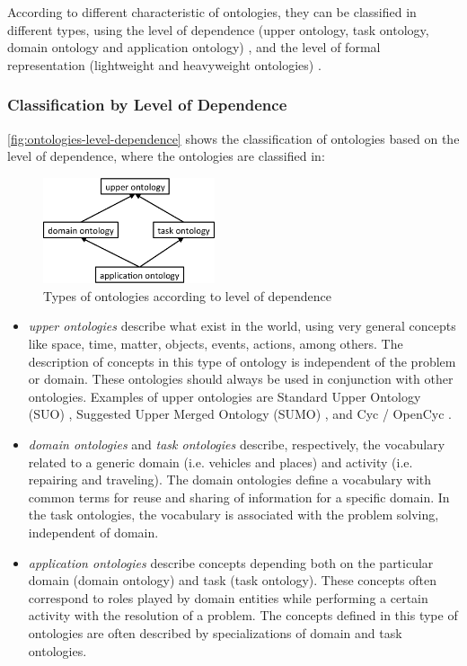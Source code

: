 According to different characteristic of ontologies, they can be classified in different types, using the level of dependence (upper ontology, task ontology, domain ontology and application ontology) \cite{Guarino1997a}, and the level of formal representation (lightweight and heavyweight ontologies) \cite{WongLiuBennamoun2012}. 

\subsubsection{Classification by Level of Dependence}
\label{subsubsec:classification-level-dependence}


\autoref{fig:ontologies-level-dependence} shows the classification of ontologies based on the level of dependence, where the ontologies are classified in:

\begin{figure}[htb]
 \caption{Types of ontologies according to level of dependence}
 \label{fig:ontologies-level-dependence}
 \centering
 \includegraphics[width=0.45\textwidth]{images/chap-general-background/ontologies-level-dependence.png}
\end{figure}

\begin{itemize}
\item \emph{upper ontologies} describe what exist in the world, using very general concepts like space, time, matter, objects, events, actions, among others.
The description of concepts in this type of ontology is independent of the problem or domain. These ontologies should always be used in conjunction with other ontologies.
Examples of upper ontologies are Standard Upper Ontology (SUO) \cite{PeaseNiles2002}, Suggested Upper Merged Ontology (SUMO) \cite{PeaseNilesLi2002}, and Cyc / OpenCyc \cite{MatuszekCabralWitbrockDeOliveira2006}.

\item \emph{domain ontologies} and \emph{task ontologies} describe, respectively, the vocabulary related to a generic domain (i.e. vehicles and places) and activity (i.e. repairing and traveling).
The domain ontologies define a vocabulary with common terms for reuse and sharing of information for a specific domain.
In the task ontologies, the vocabulary is associated with the problem solving, independent of domain.

\item \emph{application ontologies} describe concepts depending both on the particular domain (domain ontology) and task (task ontology).
These concepts often correspond to roles played by domain entities while performing a certain activity with the resolution of a problem.
The concepts defined in this type of ontologies are often described by specializations of domain and task ontologies.
\end{itemize}



